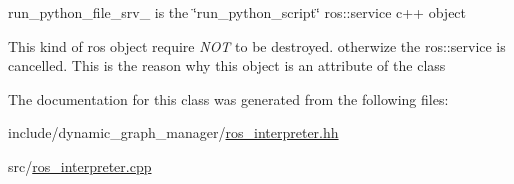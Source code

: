 run\+\_\+python\+\_\+file\+\_\+srv\+\_\+ is the \char`\"{}run\+\_\+python\+\_\+script\char`\"{} ros\+::service c++ object 

This kind of ros object require {\itshape N\+OT} to be destroyed. otherwize the ros\+::service is cancelled. This is the reason why this object is an attribute of the class 

The documentation for this class was generated from the following files\+:\begin{DoxyCompactItemize}
\item 
include/dynamic\+\_\+graph\+\_\+manager/\hyperlink{ros__interpreter_8hh}{ros\+\_\+interpreter.\+hh}\item 
src/\hyperlink{ros__interpreter_8cpp}{ros\+\_\+interpreter.\+cpp}\end{DoxyCompactItemize}
